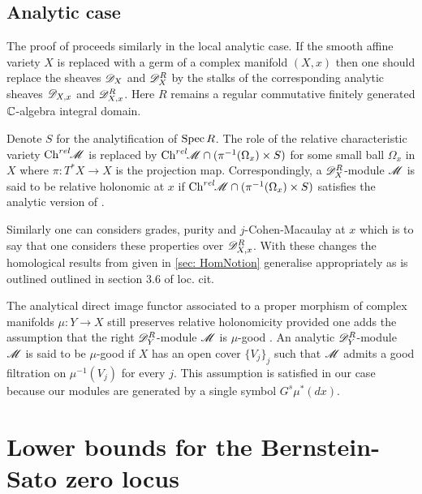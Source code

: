 \subsection{Analytic case}
The proof of  proceeds similarly in the local analytic case.
If the smooth affine variety $X$ is replaced with a germ of a complex manifold $(X,x)$ then one should replace the sheaves $\mathscr{D}_X$ and $\mathscr{D}_X^R$ by the stalks of the corresponding analytic sheaves $\mathscr{D}_{X,x}$ and $\mathscr{D}_{X,x}^R$.
Here $R$ remains a regular commutative finitely generated $\mathbb{C}$-algebra integral domain.

Denote $S$ for the analytification of $\operatorname{Spec} R$.
The role of the relative characteristic variety $\operatorname{Ch}^{rel}\mkern-5mu\mathscr{M}$ is replaced by $\operatorname{Ch}^{rel}\mkern-5mu\mathscr{M} \cap (\pi^{-1}(\Omega_x)\times S)$ for some small ball $\Omega_x$ in $X$ where $\pi:T^*X\to X$ is the projection map.
Correspondingly, a $\mathscr{D}_X^R$-module $\mathscr{M}$ is said to be relative holonomic at $x$ if $\operatorname{Ch}^{rel}\mkern-5mu\mathscr{M} \cap (\pi^{-1}(\Omega_x)\times S)$ satisfies the analytic version of .

Similarly one can considers grades, purity and $j$-Cohen-Macaulay at $x$ which is to say that one considers these properties over $\mathscr{D}_{X,x}^R$.
With these changes the homological results from \cite{budur2020zeroI} given in \cref{sec: HomNotion} generalise appropriately as is outlined outlined in section 3.6 of loc. cit.

The analytical direct image functor associated to a proper morphism of complex manifolds $\mu:Y\to X$ still preserves relative holonomicity provided one adds the assumption that the right $\mathscr{D}_Y^R$-module $\mathscr{M}$ is $\mu$-good \cite[Theorem 1.17]{AnalyticDirectIm}.
An analytic $\mathscr{D}_Y^R$-module $\mathscr{M}$ is said to be $\mu$-good if $X$ has an open cover $\{V_j\}_j$ such that $\mathscr{M}$ admits a good filtration on $\mu^{-1}(V_j)$ for every $j$.
This assumption is satisfied in our case because our modules are generated by a single symbol $G^s\mu^*(dx)$.
\section{Lower bounds for the Bernstein-Sato zero locus}\label{sec: LowerBound}

